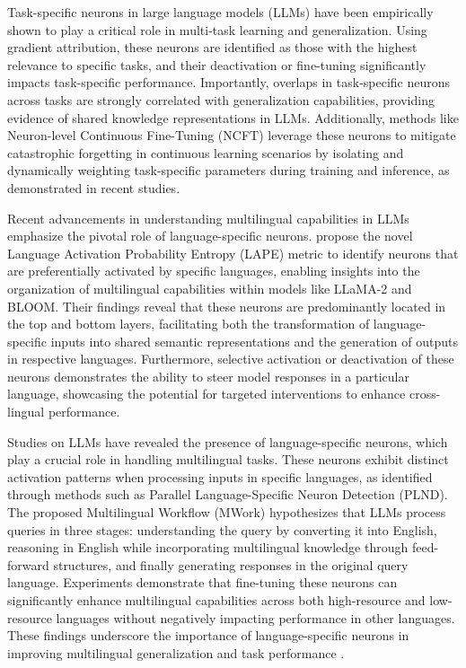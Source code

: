 Task-specific neurons \cite{leng2024} in large language models (LLMs) have been empirically shown to play a critical role in multi-task learning and generalization. Using gradient attribution, these neurons are identified as those with the highest relevance to specific tasks, and their deactivation or fine-tuning significantly impacts task-specific performance. Importantly, overlaps in task-specific neurons across tasks are strongly correlated with generalization capabilities, providing evidence of shared knowledge representations in LLMs. Additionally, methods like Neuron-level Continuous Fine-Tuning (NCFT) leverage these neurons to mitigate catastrophic forgetting in continuous learning scenarios by isolating and dynamically weighting task-specific parameters during training and inference, as demonstrated in recent studies.

Recent advancements in understanding multilingual capabilities in LLMs emphasize the pivotal role of language-specific neurons. \cite{tang2024languagespecific} propose the novel Language Activation Probability Entropy (LAPE) metric to identify neurons that are preferentially activated by specific languages, enabling insights into the organization of multilingual capabilities within models like LLaMA-2 and BLOOM. Their findings reveal that these neurons are predominantly located in the top and bottom layers, facilitating both the transformation of language-specific inputs into shared semantic representations and the generation of outputs in respective languages. Furthermore, selective activation or deactivation of these neurons demonstrates the ability to steer model responses in a particular language, showcasing the potential for targeted interventions to enhance cross-lingual performance.

Studies on LLMs have revealed the presence of language-specific neurons, which play a crucial role in handling multilingual tasks. These neurons exhibit distinct activation patterns when processing inputs in specific languages, as identified through methods such as Parallel Language-Specific Neuron Detection (PLND). The proposed Multilingual Workflow (MWork) hypothesizes that LLMs process queries in three stages: understanding the query by converting it into English, reasoning in English while incorporating multilingual knowledge through feed-forward structures, and finally generating responses in the original query language. Experiments demonstrate that fine-tuning these neurons can significantly enhance multilingual capabilities across both high-resource and low-resource languages without negatively impacting performance in other languages. These findings underscore the importance of language-specific neurons in improving multilingual generalization and task performance \cite{zhao2024large}.

